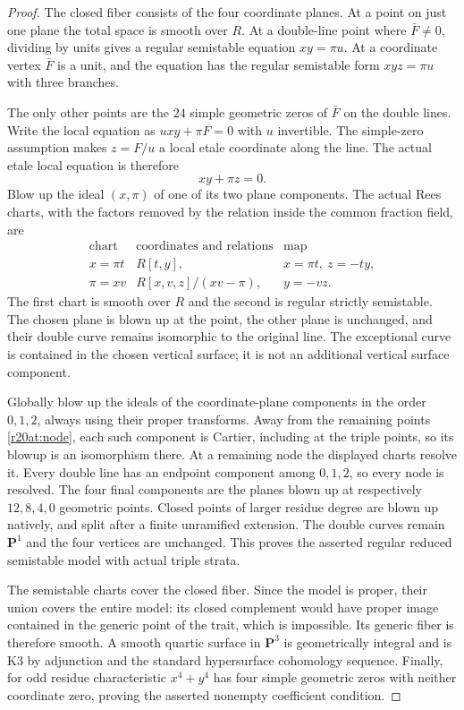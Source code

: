 \begin{proof}
The closed fiber consists of the four coordinate planes.  At a
point on just one plane the total space is smooth over $R$.
At a double-line point where $\bar F\ne0$, dividing by units
gives a regular semistable equation $xy=\pi u$.  At a coordinate
vertex $\bar F$ is a unit, and the equation has the regular
semistable form $xyz=\pi u$ with three branches.

The only other points are the $24$ simple geometric zeros of
$\bar F$ on the double lines.  Write the local equation as
$u xy+\pi F=0$ with $u$ invertible.  The simple-zero assumption
makes $z=F/u$ a local etale coordinate along the line.  The actual
etale local equation is therefore
\[
                              xy+\pi z=0.
 \tag{AT20.11}\label{r20at:node}
\]
Blow up the ideal $(x,\pi)$ of one of its two plane components.
The actual Rees charts, with the factors removed by the relation
inside the common fraction field, are
\[
 \begin{array}{c|c|c}
 \text{chart}&\text{coordinates and relations}&\text{map}\\ \hline
 x=\pi t& R[t,y],&x=\pi t,\ z=-ty,\\
 \pi=xv& R[x,v,z]/(xv-\pi),&y=-vz.
 \end{array}
 \tag{AT20.12}\label{r20at:smallresolution}
\]
The first chart is smooth over $R$ and the second is regular
strictly semistable.  The chosen plane is blown up at the point,
the other plane is unchanged, and their double curve remains
isomorphic to the original line.  The exceptional curve is contained
in the chosen vertical surface; it is not an additional vertical
surface component.

Globally blow up the ideals of the coordinate-plane components in
the order $0,1,2$, always using their proper transforms.  Away
from the remaining points \eqref{r20at:node}, each such component
is Cartier, including at the triple points, so its blowup is an
isomorphism there.  At a remaining node the displayed charts
resolve it.  Every double line has an endpoint component among
$0,1,2$, so every node is resolved.  The four final components
are the planes blown up at respectively $12,8,4,0$ geometric
points.  Closed points of larger residue degree are blown up
natively, and split after a finite unramified extension.
The double curves remain $\mathbf P^1$ and the four vertices
are unchanged.  This proves the asserted regular reduced
semistable model with actual triple strata.

The semistable charts cover the closed fiber.  Since the model
is proper, their union covers the entire model: its closed
complement would have proper image contained in the generic
point of the trait, which is impossible.  Its generic fiber is
therefore smooth.  A smooth quartic surface in $\mathbf P^3$
is geometrically integral and is K3 by adjunction and the
standard hypersurface cohomology sequence.  Finally, for odd
residue characteristic $x^4+y^4$ has four simple geometric
zeros with neither coordinate zero, proving the asserted
nonempty coefficient condition.
\end{proof}


